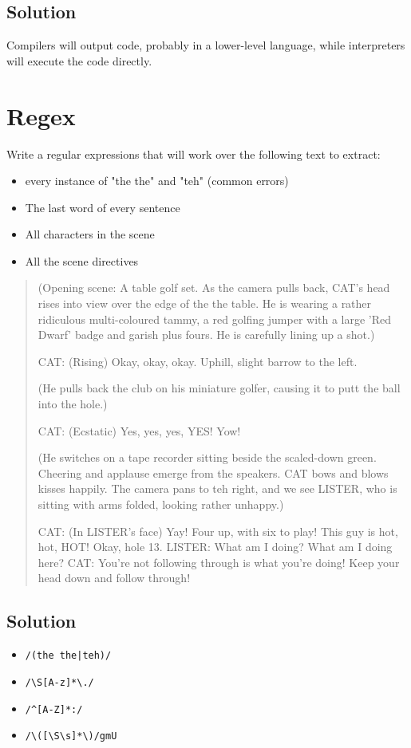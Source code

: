 \documentclass[twoside=false, DIV=14]{scrartcl}
\begin{document}
\subsection*{Solution}
Compilers will output code, probably in a lower-level language, while interpreters will execute the code directly.

\section*{Regex}
  Write a regular expressions that will work over the following text to extract:
  \begin{itemize}
    \item every instance of "the the" and "teh" (common errors)
    \item The last word of every sentence
    \item All characters in the scene
    \item All the scene directives
  \end{itemize}

  \begin{quote}
  (Opening scene:  A table golf set.  As the camera pulls back, CAT's head
  rises into view over the edge of the the table.  He is wearing a rather
  ridiculous multi-coloured tammy, a red golfing jumper with a large 'Red
  Dwarf' badge and garish plus fours.  He is carefully lining up a shot.)
  
  CAT: (Rising) Okay, okay, okay.  Uphill, slight barrow to the left.
   
  (He pulls back the club on his miniature golfer, causing it to putt the
  ball into the hole.)
   
  CAT: (Ecstatic) Yes, yes, yes, YES!  Yow!
   
  (He switches on a tape recorder sitting beside the scaled-down green.
  Cheering and applause emerge from the speakers.  CAT bows and blows
  kisses happily.  The camera pans to teh right, and we see LISTER, who is
  sitting with arms folded, looking rather unhappy.)
   
  CAT: (In LISTER's face) Yay!  Four up, with six to play!  This guy is
  hot, hot, HOT!  Okay, hole 13.
  LISTER: What am I doing?  What am I doing here?
  CAT: You're not following through is what you're doing!  Keep your head
  down and follow through!
  \end{quote}
\subsection*{Solution}
\begin{itemize}
  \item \lstinline`/(the the|teh)/`
  \item \lstinline`/\S[A-z]*\./`
  \item \lstinline`/^[A-Z]*:/`
  \item \lstinline`/\([\S\s]*\)/gmU`
\end{itemize}
\end{document}
